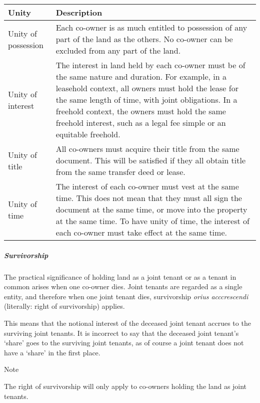 \documentclass[
]{article}
\newenvironment{env-881a4bd6-779e-4404-ae5b-86f77846f864}
{
    \savenotes\tcolorbox[blanker,breakable,left=5pt,borderline west={2pt}{-4pt}{blue}]
}
{
    \endtcolorbox\spewnotes
}
\begin{document}
\begin{longtable}[]{@{}ll@{}}
\toprule()
Unity & Description \\
\midrule()
\endhead
Unity of possession & Each co-owner is as much entitled to possession of
any part of the land as the others. No co-owner can be excluded from any
part of the land. \\
Unity of interest & The interest in land held by each co-owner must be
of the same nature and duration. For example, in a leasehold context,
all owners must hold the lease for the same length of time, with joint
obligations. In a freehold context, the owners must hold the same
freehold interest, such as a legal fee simple or an equitable
freehold. \\
Unity of title & All co-owners must acquire their title from the same
document. This will be satisfied if they all obtain title from the same
transfer deed or lease. \\
Unity of time & The interest of each co-owner must vest at the same
time. This does not mean that they must all sign the document at the
same time, or move into the property at the same time. To have unity of
time, the interest of each co-owner must take effect at the same
time. \\
\bottomrule()
\end{longtable}

\hypertarget{survivorship}{%
\subparagraph{Survivorship}\label{survivorship}}

The practical significance of holding land as a joint tenant or as a
tenant in common arises when one co-owner dies. Joint tenants are
regarded as a single entity, and therefore when one joint tenant dies,
survivorship \emph{orius acccrescendi} (literally: right of
survivorship) applies.

This means that the notional interest of the deceased joint tenant
accrues to the surviving joint tenants. It is incorrect to say that the
deceased joint tenant's `share' goes to the surviving joint tenants, as
of course a joint tenant does not have a `share' in the first place.

\begin{env-881a4bd6-779e-4404-ae5b-86f77846f864}

Note

The right of survivorship will only apply to co-owners holding the land
as joint tenants.

\end{env-881a4bd6-779e-4404-ae5b-86f77846f864}
\end{document}

